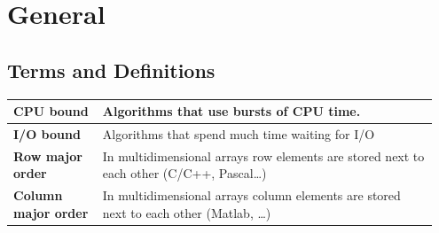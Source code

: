 \section{General}
	\subsection{Terms and Definitions}
		\begin{table}[H]
			\centering
			\begin{tabular}{|>{\bfseries}p{0.2\linewidth}|p{0.75\linewidth}|}
				 \hline
				 CPU bound
				 	& Algorithms that use bursts of CPU time.\\
				 \hline
				 I/O bound  
				 	& Algorithms that spend much time waiting for I/O\\
				 \hline		
				 Row major order  
				 	& In multidimensional arrays row elements are stored next to each other (C/C++, Pascal\ldots)\\
				 \hline
				 Column major order  
				 	& In multidimensional arrays column elements are stored next to each other (Matlab, \ldots)\\
				\hline
			\end{tabular}
		\end{table}
	
